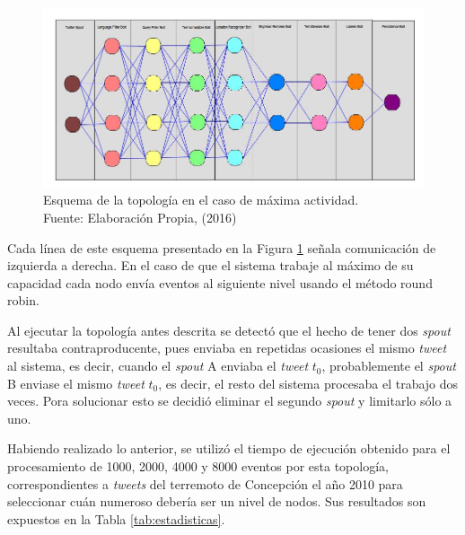 \begin{figure}[H]
	\centering
	\captionsetup{justification=centering}
	\includegraphics[scale=0.5]{images/ImplementacionTopologia1.2.png}
	\caption[Esquema de la topología en el caso de máxima actividad.]{Esquema de la topología en el caso de máxima actividad.\\Fuente: Elaboración Propia, (2016)}
	\label{fig:Implementacion1p2}
\end{figure}

Cada línea de este esquema presentado en la Figura \ref{fig:Implementacion1p2} señala comunicación de izquierda a derecha. En el caso de que el sistema trabaje al máximo de su capacidad cada nodo envía eventos al siguiente nivel usando el método round robin.

Al ejecutar la topología antes descrita se detectó que el hecho de tener dos \textit{spout} resultaba contraproducente, pues enviaba en repetidas ocasiones el mismo \textit{tweet} al sistema, es decir, cuando el \textit{spout} A enviaba el \textit{tweet}  $t_{0}$, probablemente el \textit{spout} B enviase el mismo \textit{tweet}  $t_{0}$, es decir, el resto del sistema procesaba el trabajo dos veces. Pora solucionar esto se decidió eliminar el segundo \textit{spout} y limitarlo sólo a uno.

Habiendo realizado lo anterior, se utilizó el tiempo de ejecución obtenido para el procesamiento de 1000, 2000, 4000 y 8000 eventos por esta topología, correspondientes a \textit{tweets} del terremoto de Concepción el año 2010 para seleccionar cuán numeroso debería ser un nivel de nodos. Sus resultados son expuestos en la Tabla \ref{tab:estadisticas}.

